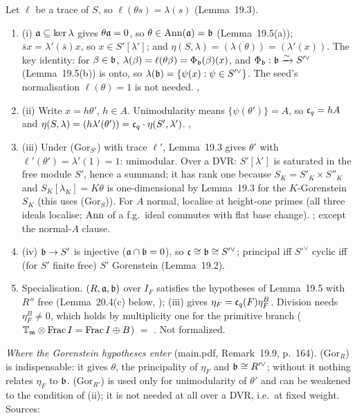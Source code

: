 \begin{outline}
Let $\ell$ be a trace of $S$, so $\ell(\theta s)=\lambda(s)$ (Lemma~19.3).
\begin{enumerate}[label=(\arabic*)]
\item (i) $\mathfrak{a}\subseteq\ker\lambda$ gives $\theta\mathfrak{a}=0$, so $\theta\in\operatorname{Ann}(\mathfrak{a})=\mathfrak{b}$ (Lemma~19.5(a)); $\bar sx=\lambda'(\bar s)x$, so $x\in S'[\lambda']$; and
  $\eta(S,\lambda)=(\lambda(\theta))=(\lambda'(x))$. The key identity: for $\beta\in\mathfrak{b}$, $\lambda(\beta)=\ell(\theta\beta)=\Phi_{\mathfrak{b}}(\beta)(x)$, and
  $\Phi_{\mathfrak{b}}:\mathfrak{b}\xrightarrow{\sim}S'^\vee$ (Lemma~19.5(b)) is onto, so $\lambda(\mathfrak{b})=\{\psi(x):\psi\in S'^\vee\}$. The seed's normalisation
  $\ell(\theta)=1$ is not needed. \stproved, \stformal
\item (ii) Write $x=h\theta'$, $h\in A$. Unimodularity means $\{\psi(\theta')\}=A$, so $\mathfrak{c}_q=hA$ and
  $\eta(S,\lambda)=(h\lambda'(\theta'))=\mathfrak{c}_q\cdot\eta(S',\lambda')$. \stproved, \stformal
\item (iii) Under (Gor$_{S'}$) with trace $\ell'$, Lemma~19.3 gives $\theta'$ with $\ell'(\theta')=\lambda'(1)=1$: unimodular. Over a DVR:
  $S'[\lambda']$ is saturated in the free module $S'$, hence a summand; it has rank one because $S_K=S'_K\times S''_K$ and
  $S_K[\lambda_K]=K\theta$ is one-dimensional by Lemma~19.3 for the $K$-Gorenstein $S_K$ (this uses (Gor$_S$)). For $A$ normal, localise
  at height-one primes (all three ideals localise; $\operatorname{Ann}$ of a f.g.\ ideal commutes with flat base change). \stproved; \stformal{} except
  the normal-$A$ clause.
\item (iv) $\mathfrak{b}\to S'$ is injective ($\mathfrak{a}\cap\mathfrak{b}=0$), so $\mathfrak{c}\cong\mathfrak{b}\cong S'^\vee$; principal iff $S'^\vee$ cyclic iff (for $S'$ finite free)
  $S'$ Gorenstein (Lemma~19.2). \stproved
\item Specialisation. $(R,\mathfrak{a},\mathfrak{b})$ over $I_F$ satisfies the hypotheses of Lemma~19.5 with $R''$ free (Lemma~20.4(c) below, \stpmc);
  (iii) gives $\eta_F=\mathfrak{c}_q(F)\eta^B_F$. Division needs $\eta^B_F\ne0$, which holds by multiplicity one for the primitive branch
  ($\mathbb{T}_{\mathfrak{m}}\otimes\mathrm{Frac}\,I=\mathrm{Frac}\,I\oplus B$) \stcited{} \cite[(3.1), p.~18]{Hs} $=$ \cite[Cor.~3.7]{Hi88b}. Not formalized.
\end{enumerate}
\emph{Where the Gorenstein hypotheses enter} (main.pdf, Remark~19.9, p.~164). (Gor$_R$) is indispensable: it gives $\theta$, the
principality of $\eta_F$ and $\mathfrak{b}\cong R'^\vee$; without it nothing relates $\eta_F$ to $\mathfrak{b}$. (Gor$_{R'}$) is used only for unimodularity
of $\theta'$ and can be weakened to the condition of (ii); it is not needed at all over a DVR, i.e.\ at fixed weight. Sources:

\end{outline}
